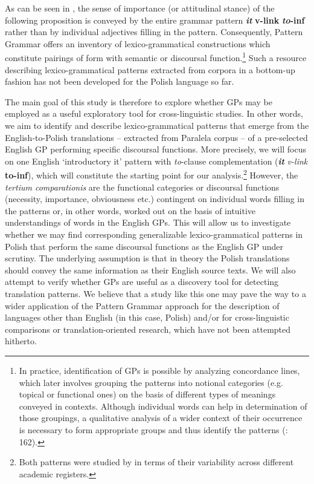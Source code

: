 \documentclass[output=paper]{langscibook}
\begin{document}
As can be seen in , the sense of importance (or attitudinal stance) of the following proposition is conveyed by the entire grammar pattern \textbf{\textit{it}} \textbf{v-link} \textbf{{\ADJ}} \textbf{\textit{to}}\textbf{{}-inf} rather than by individual adjectives filling in the pattern. Consequently, Pattern Grammar offers an inventory of lexico-grammatical constructions which constitute pairings of form with semantic or discoursal function.\footnote{In practice, identification of GPs is possible by analyzing concordance lines, which later involves grouping the patterns into notional categories (e.g. topical or functional ones) on the basis of different types of meanings conveyed in contexts. Although individual words can help in determination of those groupings, a qualitative analysis of a wider context of their occurrence is necessary to form appropriate groups and thus identify the patterns (\citealt{HunstonFrancis2000}: 162).} Such a resource describing lexico-grammatical patterns extracted from corpora in a bottom-up fashion has not been developed for the Polish language so far. 

The main goal of this study is therefore to explore whether GPs may be employed as a useful exploratory tool for cross-linguistic studies. In other words, we aim to identify and describe lexico-grammatical patterns that emerge from the English-to-Polish translations -- extracted from Paralela corpus \citep{Pęzik2016} -- of a pre-selected English GP performing specific discoursal functions. More precisely, we will focus on one English ‘introductory it’ pattern with \textit{to}{}-clause complementation (\textbf{\textit{it} }\textit{v-link}\textbf{ \textbf{{\ADJ}} \textbf{to-inf}}), which will constitute the starting point for our analysis.\footnote{Both patterns were studied by \citet{Groom2005} in terms of their variability across different academic registers.} However, the \textit{tertium comparationis} are the functional categories or discoursal functions (necessity, importance, obviousness etc.) contingent on individual words filling in the patterns or, in other words, worked out on the basis of intuitive understandings of words in the English GPs. This will allow us to investigate whether we may find corresponding generalizable lexico-grammatical patterns in Polish that perform the same discoursal functions as the English GP under scrutiny. The underlying assumption is that in theory the Polish translations should convey the same information as their English source texts. We will also attempt to verify whether GPs are useful as a discovery tool for detecting translation patterns. We believe that a study like this one may pave the way to a wider application of the Pattern Grammar approach for the description of languages other than English (in this case, Polish) and/or for cross-linguistic comparisons or translation-oriented research, which have not been attempted hitherto. 
\end{document}
